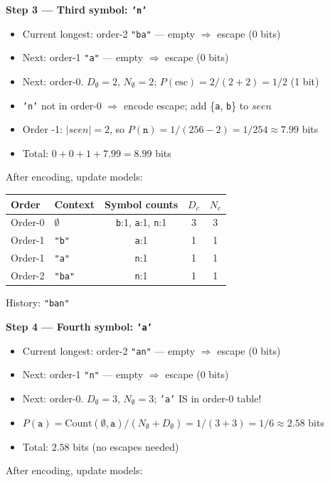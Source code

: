 \begin{examplebox}
\bigskip
\textbf{Step 3 — Third symbol: \texttt{'n'}}
\begin{itemize}
    \item Current longest: order-2 \texttt{"ba"} — empty $\Rightarrow$ escape (0 bits)
    \item Next: order-1 \texttt{"a"} — empty $\Rightarrow$ escape (0 bits)
    \item Next: order-0. $D_{\emptyset}=2$, $N_{\emptyset}=2$; $P(\text{esc}) = 2/(2+2) = 1/2$ (1 bit)
    \item \texttt{'n'} not in order-0 $\Rightarrow$ encode escape; add \{\texttt{a}, \texttt{b}\} to $seen$
    \item Order -1: $|seen| = 2$, so $P(\texttt{n}) = 1/(256-2) = 1/254 \approx 7.99$ bits
    \item Total: $0 + 0 + 1 + 7.99 = 8.99$ bits
\end{itemize}
After encoding, update models:

\begin{center}
\footnotesize
\begin{tabular}{|l|l|c|c|c|}
\hline
\textbf{Order} & \textbf{Context} & \textbf{Symbol counts} & $D_c$ & $N_c$ \\
\hline
Order-0 & $\emptyset$ & \texttt{b}:1, \texttt{a}:1, \texttt{n}:1 & 3 & 3 \\
Order-1 & \texttt{"b"} & \texttt{a}:1 & 1 & 1 \\
Order-1 & \texttt{"a"} & \texttt{n}:1 & 1 & 1 \\
Order-2 & \texttt{"ba"} & \texttt{n}:1 & 1 & 1 \\
\hline
\end{tabular}
\end{center}
History: \texttt{"ban"}

\bigskip
\textbf{Step 4 — Fourth symbol: \texttt{'a'}}
\begin{itemize}
    \item Current longest: order-2 \texttt{"an"} — empty $\Rightarrow$ escape (0 bits)
    \item Next: order-1 \texttt{"n"} — empty $\Rightarrow$ escape (0 bits)
    \item Next: order-0. $D_{\emptyset}=3$, $N_{\emptyset}=3$; \texttt{'a'} IS in order-0 table!
    \item $P(\texttt{a}) = \text{Count}(\emptyset,\texttt{a})/(N_{\emptyset}+D_{\emptyset}) = 1/(3+3) = 1/6 \approx 2.58$ bits
    \item Total: $2.58$ bits (no escapes needed)
\end{itemize}
After encoding, update models:


\end{examplebox}
